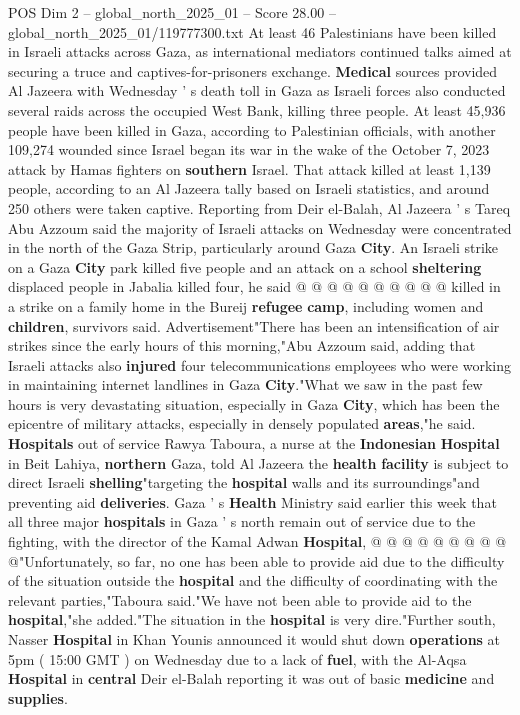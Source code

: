 \begin{textsample}{POS Dim 2 – global\_north\_2025\_01 – Score 28.00 – global\_north\_2025\_01/119777300.txt}  \label{ex:f2_pos_363}
At least 46 Palestinians have been killed in Israeli attacks across Gaza, as international mediators continued talks aimed at securing a truce and captives-for-prisoners exchange. \textbf{Medical} sources provided Al Jazeera with Wednesday ' s death toll in Gaza as Israeli forces also conducted several raids across the occupied West Bank, killing three people.
At least 45,936 people have been killed in Gaza, according to Palestinian officials, with another 109,274 wounded since Israel began its war in the wake of the October 7, 2023 attack by Hamas fighters on \textbf{southern} Israel.
That attack killed at least 1,139 people, according to an Al Jazeera tally based on Israeli statistics, and around 250 others were taken captive.
Reporting from Deir el-Balah, Al Jazeera ' s Tareq Abu Azzoum said the majority of Israeli attacks on Wednesday were concentrated in the north of the Gaza Strip, particularly around Gaza \textbf{City}.
An Israeli strike on a Gaza \textbf{City} park killed five people and an attack on a school \textbf{sheltering} displaced people in Jabalia killed four, he said @ @ @ @ @ @ @ @ @ @ killed in a strike on a family home in the Bureij \textbf{refugee} \textbf{camp}, including women and \textbf{children}, survivors said.
Advertisement"There has been an intensification of air strikes since the early hours of this morning,"Abu Azzoum said, adding that Israeli attacks also \textbf{injured} four telecommunications employees who were working in maintaining internet landlines in Gaza \textbf{City}."What we saw in the past few hours is very devastating situation, especially in Gaza \textbf{City}, which has been the epicentre of military attacks, especially in densely populated \textbf{areas},"he said. \textbf{Hospitals} out of service Rawya Taboura, a nurse at the \textbf{Indonesian} \textbf{Hospital} in Beit Lahiya, \textbf{northern} Gaza, told Al Jazeera the \textbf{health} \textbf{facility} is subject to direct Israeli \textbf{shelling}"targeting the \textbf{hospital} walls and its surroundings"and preventing aid \textbf{deliveries}.
Gaza ' s \textbf{Health} Ministry said earlier this week that all three major \textbf{hospitals} in Gaza ' s north remain out of service due to the fighting, with the director of the Kamal Adwan \textbf{Hospital}, @ @ @ @ @ @ @ @ @ @"Unfortunately, so far, no one has been able to provide aid due to the difficulty of the situation outside the \textbf{hospital} and the difficulty of coordinating with the relevant parties,"Taboura said."We have not been able to provide aid to the \textbf{hospital},"she added."The situation in the \textbf{hospital} is very dire."Further south, Nasser \textbf{Hospital} in Khan Younis announced it would shut down \textbf{operations} at 5pm ( 15:00 GMT ) on Wednesday due to a lack of \textbf{fuel}, with the Al-Aqsa \textbf{Hospital} in \textbf{central} Deir el-Balah reporting it was out of basic \textbf{medicine} and \textbf{supplies}.

\end{textsample}

